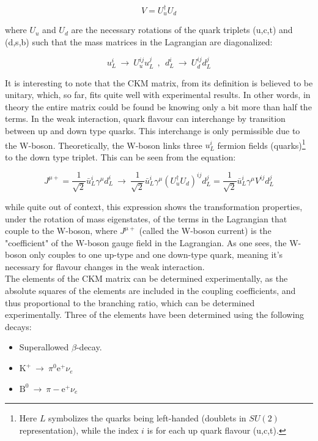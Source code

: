 \documentclass[11pt,a4paper]{article}
\begin{document}
\begin{equation}
V = U_u^\dagger U_d
\end{equation}

where $U_u$ and $U_d$ are the necessary rotations of the quark triplets (u,c,t) and (d,s,b) such that the mass matrices in the Lagrangian are diagonalized:

\begin{equation}
u_L^i \:\rightarrow\: U_u^{ij} u_L^j \:\:,\:\:
d_L^i \:\rightarrow\: U_d^{ij} d_L^j
\end{equation}

It is interesting to note that the CKM matrix, from its definition is believed to be unitary, which, so far, fits quite well with experimental results. In other words, in theory the entire matrix could be found be knowing only a bit more than half the terms. In the weak interaction, quark flavour can interchange by transition between up and down type quarks. This interchange is only permissible due to the W-boson. Theoretically, the W-boson links three $u_L^i$ fermion fields (quarks)\footnote{Here $L$ symbolizes the quarks being left-handed (doublets in $SU(2)$ representation), while the index $i$ is for each up quark flavour (u,c,t).} to the down type triplet. This can be seen from the equation:

\begin{equation}
J^{\mu+} = \frac{1}{\sqrt{2}}\bar{u}_L^i\gamma^\mu d_L^i \:\rightarrow\: \frac{1}{\sqrt{2}}\bar{u}_L^i\gamma^\mu (U_u^\dagger U_d)^{ij}d_L^j = 
\frac{1}{\sqrt{2}}\bar{u}_L^i\gamma^\mu V^{ij}d_L^j
\end{equation}

while quite out of context, this expression shows the transformation properties, under the rotation of mass eigenstates, of the terms in the Lagrangian that couple to the W-boson, where $J^{\mu+}$ (called the W-boson current) is the "coefficient" of the W-boson gauge field in the Lagrangian. As one sees, the W-boson only couples to one up-type and one down-type quark, meaning it's necessary for flavour changes in the weak interaction.\\

The elements of the CKM matrix can be determined experimentally, as the absolute squares of the elements are included in the coupling coefficients, and thus proportional to the branching ratio, which can be determined experimentally. Three of the elements have been determined using the following decays:

\begin{itemize}\centering
	\item Superallowed $\beta$-decay.
	\item $\text{K}^+ \:\rightarrow\: \pi^0\text{e}^+\nu_e$\\
	\item $\text{B}^0 \:\rightarrow\: \pi-\text{e}^+\nu_e$
\end{itemize}
\end{document}
